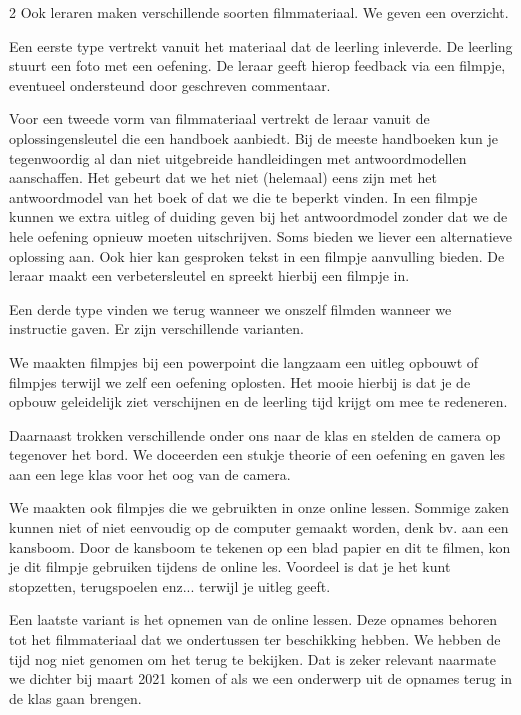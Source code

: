 \begin{multicols}{2}
Ook leraren maken verschillende soorten filmmateriaal. We geven een overzicht. 

Een eerste type vertrekt vanuit het materiaal dat de leerling inleverde. De leerling stuurt een foto met een oefening. De leraar geeft hierop feedback via een filmpje, eventueel ondersteund door geschreven commentaar. 

Voor een tweede vorm van filmmateriaal vertrekt de leraar vanuit de oplossingensleutel die een handboek aanbiedt. Bij de meeste handboeken kun je tegenwoordig al dan niet uitgebreide handleidingen met antwoordmodellen aanschaffen. Het gebeurt dat we het niet (helemaal) eens zijn met het antwoordmodel van het boek of dat we die te beperkt vinden. In een filmpje kunnen we extra uitleg of duiding geven bij het antwoordmodel zonder dat we de hele oefening opnieuw moeten uitschrijven. Soms bieden we liever een alternatieve oplossing aan. Ook hier kan gesproken tekst in een filmpje aanvulling bieden. De leraar maakt een verbetersleutel en spreekt hierbij een filmpje in.

Een derde type vinden we terug wanneer we onszelf filmden wanneer we instructie gaven. Er zijn verschillende varianten. 

We maakten filmpjes bij een powerpoint die langzaam een uitleg opbouwt of filmpjes terwijl we zelf een oefening oplosten. Het mooie hierbij is dat je de opbouw geleidelijk ziet verschijnen en de leerling tijd krijgt om mee te redeneren.  

Daarnaast trokken verschillende onder ons naar de klas en stelden de camera op tegenover het bord. We doceerden een stukje theorie of een oefening en gaven les aan een lege klas voor het oog van de camera. 

We maakten ook filmpjes die we gebruikten in onze online lessen. Sommige zaken kunnen niet of niet eenvoudig op de computer gemaakt worden, denk bv. aan een kansboom. Door de kansboom te tekenen op een blad papier en dit te filmen, kon je dit filmpje gebruiken tijdens de online les. Voordeel is dat je het kunt stopzetten, terugspoelen enz... terwijl je uitleg geeft.  

Een laatste variant is het opnemen van de online lessen. Deze opnames behoren tot het filmmateriaal dat we ondertussen ter beschikking hebben. We hebben de tijd nog niet genomen om het terug te bekijken. Dat is zeker relevant naarmate we dichter bij maart 2021 komen of als we een onderwerp uit de opnames terug in de klas gaan brengen. 


\end{multicols}
